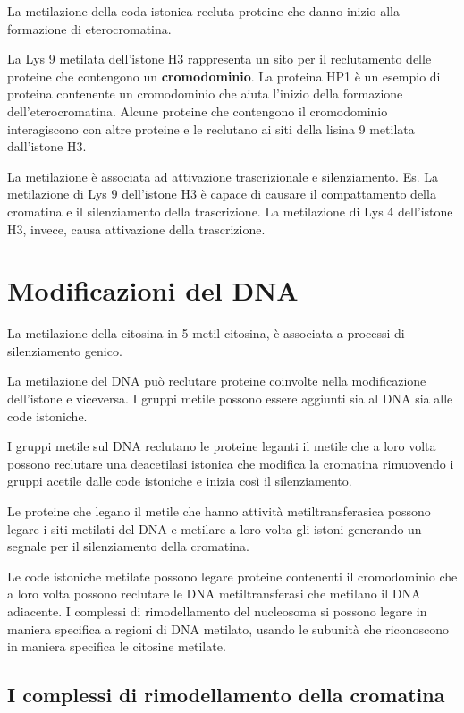 \documentclass[11pt]{book}
\begin{document}
La metilazione della coda istonica recluta proteine che danno inizio
alla formazione di eterocromatina.

La Lys 9 metilata dell'istone H3 rappresenta un sito per il reclutamento
delle proteine che contengono un \textbf{cromodominio}. La proteina HP1
è un esempio di proteina contenente un cromodominio che aiuta l'inizio
della formazione dell'eterocromatina. Alcune proteine che contengono il
cromodominio interagiscono con altre proteine e le reclutano ai siti
della lisina 9 metilata dall'istone H3.

La metilazione è associata ad attivazione trascrizionale e
silenziamento. Es. La metilazione di Lys 9 dell'istone H3 è capace di
causare il compattamento della cromatina e il silenziamento della
trascrizione. La metilazione di Lys 4 dell'istone H3, invece, causa
attivazione della trascrizione.

\chapter{Modificazioni del DNA}\label{modificazioni-del-dna}

La metilazione della citosina in 5 metil-citosina, è associata a
processi di silenziamento genico.

La metilazione del DNA può reclutare proteine coinvolte nella
modificazione dell'istone e viceversa. I gruppi metile possono essere
aggiunti sia al DNA sia alle code istoniche.

I gruppi metile sul DNA reclutano le proteine leganti il metile che a
loro volta possono reclutare una deacetilasi istonica che modifica la
cromatina rimuovendo i gruppi acetile dalle code istoniche e inizia così
il silenziamento.

Le proteine che legano il metile che hanno attività metiltransferasica
possono legare i siti metilati del DNA e metilare a loro volta gli
istoni generando un segnale per il silenziamento della cromatina.

Le code istoniche metilate possono legare proteine contenenti il
cromodominio che a loro volta possono reclutare le DNA metiltransferasi
che metilano il DNA adiacente. I complessi di rimodellamento del
nucleosoma si possono legare in maniera specifica a regioni di DNA
metilato, usando le subunità che riconoscono in maniera specifica le
citosine metilate.

\section{I complessi di rimodellamento della
cromatina}\label{i-complessi-di-rimodellamento-della-cromatina}
\end{document}
